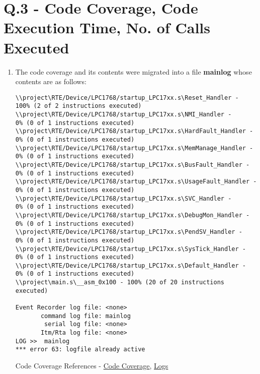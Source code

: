 \documentclass[12pt]{article}
\begin{document}

\section{Q.3 - Code Coverage, Code Execution Time, No. of Calls Executed}
\begin{enumerate}[label=(\alph*)]
    \item The code coverage and its contents were migrated into a file \textbf{mainlog} whose contents are as follows:
    \begin{verbatim}
\\project\RTE/Device/LPC1768/startup_LPC17xx.s\Reset_Handler - 
100% (2 of 2 instructions executed)
\\project\RTE/Device/LPC1768/startup_LPC17xx.s\NMI_Handler - 
0% (0 of 1 instructions executed)
\\project\RTE/Device/LPC1768/startup_LPC17xx.s\HardFault_Handler - 
0% (0 of 1 instructions executed)
\\project\RTE/Device/LPC1768/startup_LPC17xx.s\MemManage_Handler - 
0% (0 of 1 instructions executed)
\\project\RTE/Device/LPC1768/startup_LPC17xx.s\BusFault_Handler - 
0% (0 of 1 instructions executed)
\\project\RTE/Device/LPC1768/startup_LPC17xx.s\UsageFault_Handler - 
0% (0 of 1 instructions executed)
\\project\RTE/Device/LPC1768/startup_LPC17xx.s\SVC_Handler - 
0% (0 of 1 instructions executed)
\\project\RTE/Device/LPC1768/startup_LPC17xx.s\DebugMon_Handler - 
0% (0 of 1 instructions executed)
\\project\RTE/Device/LPC1768/startup_LPC17xx.s\PendSV_Handler - 
0% (0 of 1 instructions executed)
\\project\RTE/Device/LPC1768/startup_LPC17xx.s\SysTick_Handler - 
0% (0 of 1 instructions executed)
\\project\RTE/Device/LPC1768/startup_LPC17xx.s\Default_Handler - 
0% (0 of 1 instructions executed)
\\project\main.s\__asm_0x100 - 100% (20 of 20 instructions executed)

Event Recorder log file: <none>
       command log file: mainlog
        serial log file: <none>
       Itm/Rta log file: <none>
LOG >>  mainlog
*** error 63: logfile already active

    \end{verbatim}
Code Coverage References - \href{https://www.keil.com/support/man/docs/uv4cl/uv4cl_cm_coverage.htm}{Code Coverage}, \href{https://www.keil.com/support/man/docs/uv4cl/uv4cl_cm_log.htm}{Logs}


\end{enumerate}
\end{document}

